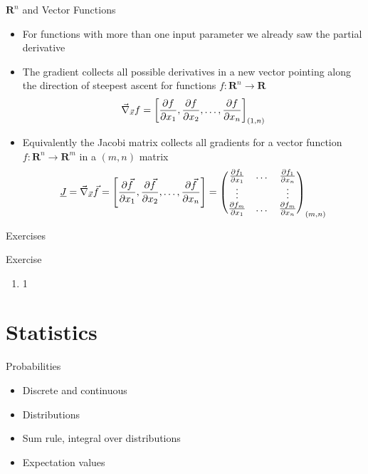   \begin{frame}{$\mathbf{R}^n$ and Vector Functions}
    \begin{itemize}
      \item For functions with more than one input parameter we already saw the partial derivative
      \item The gradient collects all possible derivatives in a new vector pointing along the direction of steepest ascent for functions $f:\mathbf{R}^n\rightarrow \mathbf{R}$
      \begin{equation*}
        \vec{\nabla}_{\vec{x}} f = \left[
          \frac{\partial f}{\partial x_1}, \frac{\partial f}{\partial x_2}, \dots, \frac{\partial f}{\partial x_n} \right]_{(1, n)}
      \end{equation*}
      \item Equivalently the Jacobi matrix collects all gradients for a vector function $f:\mathbf{R}^n\rightarrow\mathbf{R}^m$ in a $(m, n)$ matrix
      \begin{equation*}
        \underline{J} = \vec{\nabla}_{\vec{x}} \vec{f} = \left[
          \frac{\partial \vec{f}}{\partial x_1}, \frac{\partial \vec{f}}{\partial x_2}, \dots, \frac{\partial \vec{f}}{\partial x_n} \right] =
          \begin{pmatrix}
            \frac{\partial f_1}{\partial x_1} & \dots & \frac{\partial f_1}{\partial x_n} \\
            \vdots & & \vdots \\
            \frac{\partial f_m}{\partial x_1} & \dots & \frac{\partial f_m}{\partial x_n}
          \end{pmatrix}_{(m, n)}
      \end{equation*}
    \end{itemize}
  \end{frame}

  \begin{frame}{Exercises}
    \begin{exampleblock}{Exercise}
      \begin{enumerate}
        \item 1
      \end{enumerate}
    \end{exampleblock}
  \end{frame}

  \section{Statistics}
  \begin{frame}{Probabilities}
    \begin{itemize}
      \item Discrete and continuous
      \item Distributions
      \item Sum rule, integral over distributions
      \item Expectation values
    \end{itemize}
  \end{frame}

